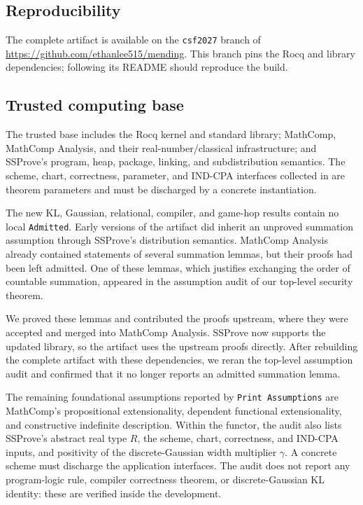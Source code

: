 \subsection{Reproducibility}

The complete artifact is available on the \texttt{csf2027} branch of
\url{https://github.com/ethanlee515/mending}.
This branch pins the Rocq and library dependencies; following its README
should reproduce the build.

\subsection{Trusted computing base}
\label{sec:tcb}

The trusted base includes the Rocq kernel and standard library; MathComp,
MathComp Analysis, and their real-number/classical infrastructure; and
SSProve's program, heap, package, linking, and subdistribution semantics.
The scheme, chart, correctness, parameter, and IND-CPA interfaces collected in
 are theorem parameters and must be discharged by a
concrete instantiation.

The new KL, Gaussian, relational, compiler, and game-hop results contain no
local \texttt{Admitted}. Early versions of the artifact did inherit an
unproved summation assumption through SSProve's distribution semantics.
MathComp Analysis already contained statements of several summation lemmas,
but their proofs had been left admitted. One of these lemmas, which justifies
exchanging the order of countable summation, appeared in the assumption audit
of our top-level security theorem.

We proved these lemmas and contributed the proofs upstream, where they were
accepted and merged into MathComp Analysis.
SSProve now supports the updated library, so the artifact uses the upstream
proofs directly. After rebuilding the complete artifact with these
dependencies, we reran the top-level assumption audit and confirmed that it
no longer reports an admitted summation lemma.

The remaining foundational assumptions reported by \texttt{Print Assumptions}
are MathComp's propositional extensionality, dependent functional
extensionality, and constructive indefinite description. Within the functor,
the audit also lists SSProve's abstract real type \(R\), the scheme, chart,
correctness, and IND-CPA inputs, and positivity of the discrete-Gaussian width
multiplier \(\gamma\). A concrete scheme must discharge the application
interfaces. The audit does not report any program-logic rule, compiler
correctness theorem, or discrete-Gaussian KL identity: these are verified
inside the development.


